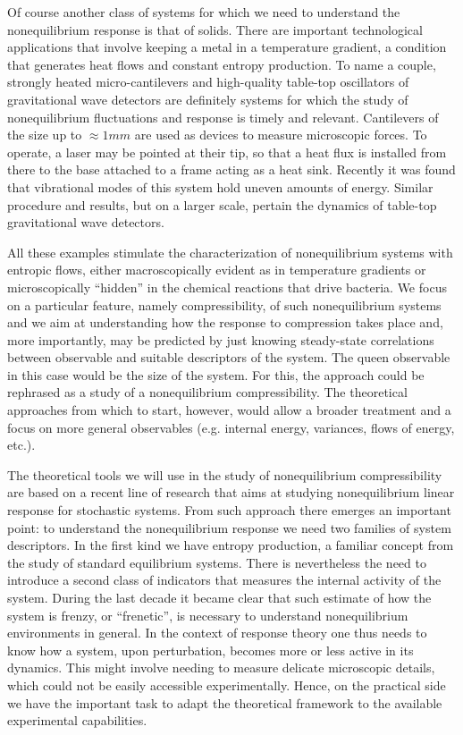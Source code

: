 \begin{workpackage}
\begin{wpdescription}
Of course another class of systems for which we need to understand the nonequilibrium response is that of solids.
There are important technological applications that involve keeping a metal in a temperature gradient, a condition
that generates heat flows and constant entropy production. To name a couple, strongly
heated micro-cantilevers and high-quality table-top oscillators of gravitational wave detectors are definitely
systems for which the study of nonequilibrium fluctuations and response is timely and relevant.
Cantilevers of the size up to $\approx 1 mm$ are used as devices to measure microscopic forces. To operate, a laser
may be pointed at their tip, so that a heat flux is installed from there to the base attached to a frame acting
as a heat sink. Recently it was found that vibrational modes of this system hold uneven amounts of energy.
Similar procedure and results, but on a larger scale, pertain the dynamics of table-top gravitational wave detectors.

All these examples stimulate the characterization of nonequilibrium systems with entropic flows, either macroscopically
 evident as in temperature gradients or microscopically ``hidden'' in the chemical reactions that drive bacteria. 
We focus on a particular feature, namely compressibility, of such nonequilibrium systems and we aim at understanding
how the response to compression takes place and, more importantly,
may be predicted by just knowing steady-state correlations
between observable and suitable descriptors of the system. The queen observable in this case would be the size of the
system. For this, the approach could be rephrased as a study of a nonequilibrium compressibility. The theoretical 
approaches from which to start, however, would allow a broader treatment and a focus on more general observables 
(e.g. internal energy, variances, flows of energy, etc.).

The theoretical tools we will use in the study of nonequilibrium compressibility are based on a recent line of research
that aims at studying nonequilibrium linear response for stochastic systems. From such approach there emerges an
important point: to understand the nonequilibrium response we need two families of system descriptors. In the first
kind we have entropy production, a familiar concept from the study of standard equilibrium systems. There is
 nevertheless the need to introduce a second class of indicators that measures the internal activity of the system.
During the last decade it became clear that such estimate of how the system is frenzy, or ``frenetic'', is necessary 
to understand nonequilibrium environments in general. In the context of response theory one thus needs to know
how a system, upon perturbation, becomes more or less active in its dynamics. This might involve needing
to measure delicate microscopic details, which could not be easily accessible experimentally. Hence, on the practical
side we have the important task to adapt the theoretical framework to the available experimental capabilities.






\end{wpdescription}
\end{workpackage}
